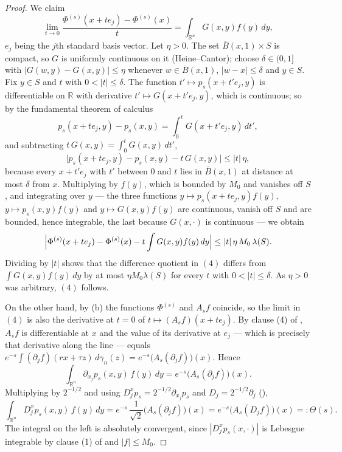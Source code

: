 \begin{proof}
We claim
\begin{equation*}
  \lim_{t\to0}\frac{\Phi^{(s)}(x+te_j)-\Phi^{(s)}(x)}{t}
    = \int_{\mathbb{R}^n}G(x,y)f(y)\,dy , \tag{4}
\end{equation*}
$e_j$ being the $j$th standard basis vector.  Let $\eta > 0$.  The set
$\overline B(x,1)\times S$ is compact, so $G$ is uniformly continuous on it
(Heine--Cantor); choose $\delta \in (0,1]$ with
$|G(w,y)-G(x,y)| \leq \eta$ whenever $w \in \overline B(x,1)$,
$|w-x| \leq \delta$ and $y \in S$.  Fix $y \in S$ and $t$ with
$0 < |t| \leq \delta$.  The function $t' \mapsto p_s(x+t'e_j,y)$ is
differentiable on $\mathbb{R}$ with derivative $t' \mapsto G(x+t'e_j,y)$, which
is continuous; so by the fundamental theorem of calculus
\[
  p_s(x+te_j,y) - p_s(x,y) = \int_0^t G(x+t'e_j,y)\,dt' ,
\]
and subtracting $t\,G(x,y) = \int_0^tG(x,y)\,dt'$,
\[
  \bigl|p_s(x+te_j,y)-p_s(x,y)-t\,G(x,y)\bigr| \leq |t|\,\eta ,
\]
because every $x+t'e_j$ with $t'$ between $0$ and $t$ lies in
$\overline B(x,1)$ at distance at most $\delta$ from $x$.  Multiplying by
$f(y)$, which is bounded by $M_0$ and vanishes off $S$, and integrating over
$y$ --- the three functions $y \mapsto p_s(x+te_j,y)f(y)$,
$y \mapsto p_s(x,y)f(y)$ and $y \mapsto G(x,y)f(y)$ are continuous, vanish off
$S$ and are bounded, hence integrable, the last because $G(x,\cdot)$ is
continuous --- we obtain
\[
  \Bigl|\Phi^{(s)}(x+te_j)-\Phi^{(s)}(x)-t\int G(x,y)f(y)\,dy\Bigr|
    \leq |t|\,\eta\,M_0\,\lambda(S) .
\]
Dividing by $|t|$ shows that the difference quotient in $(4)$ differs from
$\int G(x,y)f(y)\,dy$ by at most $\eta M_0\lambda(S)$ for every $t$ with
$0 < |t| \leq \delta$.  As $\eta > 0$ was arbitrary, $(4)$ follows.

On the other hand, by (b) the functions $\Phi^{(s)}$ and $A_sf$ coincide, so the
limit in $(4)$ is also the derivative at $t=0$ of $t \mapsto (A_sf)(x+te_j)$.
By clause (4) of , $A_sf$ is differentiable at
$x$ and the value of its derivative at $e_j$ --- which is precisely that
derivative along the line --- equals $e^{-s}\int(\partial_jf)(rx+\tau z)\,
d\gamma_n(z) = e^{-s}\bigl(A_s(\partial_jf)\bigr)(x)$.  Hence
\[
  \int_{\mathbb{R}^n}\partial_{x_j}p_s(x,y)\,f(y)\,dy
    = e^{-s}\bigl(A_s(\partial_jf)\bigr)(x) .
\]
Multiplying by $2^{-1/2}$ and using $D_j^xp_s = 2^{-1/2}\partial_{x_j}p_s$ and
$D_j = 2^{-1/2}\partial_j$ (),
\begin{equation*}
  \int_{\mathbb{R}^n}D_j^xp_s(x,y)\,f(y)\,dy
    = e^{-s}\,\frac{1}{\sqrt2}\bigl(A_s(\partial_jf)\bigr)(x)
    = e^{-s}\bigl(A_s(D_jf)\bigr)(x)
    =: \Theta(s) . \tag{5}
\end{equation*}
The integral on the left is absolutely convergent, since
$|D_j^xp_s(x,\cdot)|$ is Lebesgue integrable by clause (1) of
 and $|f| \leq M_0$.


\end{proof}
